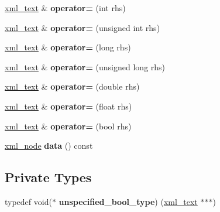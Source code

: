 \begin{DoxyCompactItemize}
\mbox{\label{classpugi_1_1xml__text_a594653404f095b07d4644a0567f9ec51}} 
\hyperlink{classpugi_1_1xml__text}{xml\+\_\+text} \& {\bfseries operator=} (int rhs)
\item 
\mbox{\label{classpugi_1_1xml__text_a48e2aa3796629258d1f037d1bc2277f7}} 
\hyperlink{classpugi_1_1xml__text}{xml\+\_\+text} \& {\bfseries operator=} (unsigned int rhs)
\item 
\mbox{\label{classpugi_1_1xml__text_aafebcd3794846d78578bee6feeaefbaf}} 
\hyperlink{classpugi_1_1xml__text}{xml\+\_\+text} \& {\bfseries operator=} (long rhs)
\item 
\mbox{\label{classpugi_1_1xml__text_ad5bd2426b8a4294f156d1dd129a636d1}} 
\hyperlink{classpugi_1_1xml__text}{xml\+\_\+text} \& {\bfseries operator=} (unsigned long rhs)
\item 
\mbox{\label{classpugi_1_1xml__text_a0ff3e37177494d9cdfa073c6392ca405}} 
\hyperlink{classpugi_1_1xml__text}{xml\+\_\+text} \& {\bfseries operator=} (double rhs)
\item 
\mbox{\label{classpugi_1_1xml__text_ab2ef884aa761a5ef96eb643a11c6734a}} 
\hyperlink{classpugi_1_1xml__text}{xml\+\_\+text} \& {\bfseries operator=} (float rhs)
\item 
\mbox{\label{classpugi_1_1xml__text_afd64e76239853fcf57e80b8f43a3fb4d}} 
\hyperlink{classpugi_1_1xml__text}{xml\+\_\+text} \& {\bfseries operator=} (bool rhs)
\item 
\mbox{\label{classpugi_1_1xml__text_a7989ff7cc4832af16850fc344a96a56f}} 
\hyperlink{classpugi_1_1xml__node}{xml\+\_\+node} {\bfseries data} () const
\end{DoxyCompactItemize}
\subsection*{Private Types}
\begin{DoxyCompactItemize}
\item 
\mbox{\label{classpugi_1_1xml__text_aed0e5b5e5cbf50284016812ea4d39309}} 
typedef void($\ast$ {\bfseries unspecified\+\_\+bool\+\_\+type}) (\hyperlink{classpugi_1_1xml__text}{xml\+\_\+text} $\ast$$\ast$$\ast$)
\end{DoxyCompactItemize}
